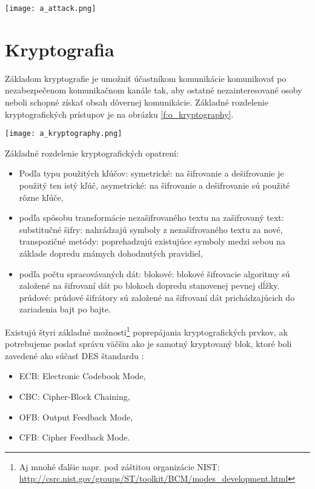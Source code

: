 \documentclass[12pt,a4paper,oneside,openright]{report}
\begin{document}
\begin{figure*}[h]
	\centering
	\texttt{[image: a\_attack.png]}
	\caption{Všeobecný priebeh útoku 
	\cite{bidgoli2006handbook}.}
	\label{f:o_attack}
\end{figure*}

\section{Kryptografia} \label{s_cryptography}
Základom kryptografie je umožniť účastníkom komunikácie komunikovať po nezabezpečenom komunikačnom kanále tak, aby ostatné nezainteresované osoby neboli schopné získať obsah dôvernej komunikácie\cite{cryptodef}. Základné rozdelenie kryptografických prístupov je na obrázku \ref{f:o_kryptography}.

\begin{figure*}[!htb]
	\centering
	\texttt{[image: a\_kryptography.png]}
	\caption{Rozdelenie kryptografických prístupov\cite{bidgoli2006handbook}.}
	\label{f:o_kryptography}
\end{figure*}

Základné rozdelenie kryptografických opatrení:
\singlespacing
\begin{itemize}
	\item Podľa typu použitých kľúčov:
		\subitem symetrické: na šifrovanie a dešifrovanie je použitý ten istý kľúč,
		\subitem asymetrické: na šifrovanie a dešifrovanie sú použité rôzne kľúče,
	\item podľa spôsobu transformácie nezašifrovaného textu na zašifrovaný text:
		\subitem substitučné šifry: nahrádzajú symboly z nezašifrovaného textu za nové,
		\subitem transpozičné metódy: poprehadzujú existujúce symboly medzi sebou na základe dopredu známych dohodnutých pravidiel,
	\item podľa počtu spracovávaných dát:
		\subitem blokové: blokové šifrovacie algoritmy sú založené na šifrovaní dát po blokoch dopredu stanovenej pevnej dĺžky.
		\subitem prúdové: prúdové šifrátory sú založené na šifrovaní dát prichádzajúcich do zariadenia bajt po bajte.
\end{itemize}
\onehalfspacing


Existujú štyri základné možnosti\footnote{Aj mnohé ďalšie napr. pod záštitou organizácie NIST: \url{http://csrc.nist.gov/groups/ST/toolkit/BCM/modes_development.html}} poprepájania kryptografických prvkov, ak potrebujeme poslať správu väčšiu ako je samotný kryptovaný blok, ktoré boli zavedené ako súčasť DES štandardu \cite{bidgoli2006handbook}:
\singlespacing
\begin{itemize}
	\item ECB: Electronic Codebook Mode,
	\item CBC: Cipher-Block Chaining,
	\item OFB: Output Feedback Mode,
	\item CFB: Cipher Feedback Mode.
\end{itemize}
\onehalfspacing
\end{document}
